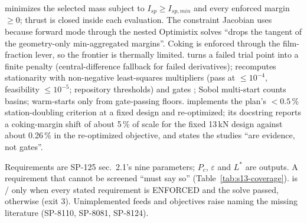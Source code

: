  minimizes the selected mass subject to $I_{sp}\ge I_{sp,min}$ and every enforced margin $\ge0$; thrust is closed inside each evaluation. The constraint Jacobian uses  because forward mode through the nested Optimistix solves ``drops the tangent of the geometry-only min-aggregated margins''. Coking is enforced through the film-fraction lever, so the frontier is thermally limited.  turns a failed trial point into a finite penalty (central-difference fallback for failed derivatives);  recomputes stationarity with non-negative least-squares multipliers (pass at $\le10^{-4}$, feasibility $\le10^{-5}$; repository thresholds) and gates ; Sobol multi-start counts basins;  warm-starts only from gate-passing floors.  implements the plan's $<0.5$\,\% station-doubling criterion at a fixed design and re-optimized; its docstring reports a coking-margin shift of about 5\,\% of scale for the fixed 13\,kN design against about 0.26\,\% in the re-optimized objective, and states the studies ``are evidence, not gates''.

Requirements are SP-125 sec.~2.1's nine parameters; $P_c$, $\varepsilon$ and $L^*$ are outputs. A requirement that cannot be screened ``must say so'' (Table~\ref{tab:s13-coverage}).  is / only when every stated requirement is ENFORCED and the solve passed, otherwise  (exit 3). Unimplemented feeds and objectives raise  naming the missing literature (SP-8110, SP-8081, SP-8124).


